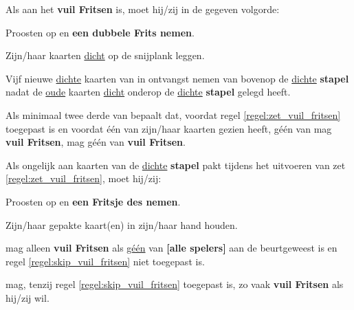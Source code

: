 \newpage
{}
\label{sec:vuil_fritsen}


\vervolgLijst{}
    \item Als \eenSpeler aan het \textbf{vuil Fritsen} is, moet hij/zij in de gegeven volgorde:
    \puntLijst{}
        \item Proosten op  en \textbf{een dubbele Frits nemen}\footnotemark[3].
        \item Zijn/haar kaarten \ul{dicht} op de snijplank leggen.
        \item Vijf nieuwe \ul{dichte} kaarten van \Frits in ontvangst nemen van bovenop de \ul{dichte} \textbf{stapel} nadat \Frits de \ul{oude} kaarten \ul{dicht} onderop de \ul{dichte} \textbf{stapel} gelegd heeft\footnotemark[2].
    \eindPuntLijst{}
     \label{regel:zet_vuil_fritsen}
\eindLijst{}

\vervolgLijst{}
    \item Als minimaal twee derde van \alleSpelers bepaalt dat, voordat regel \ref{regel:zet_vuil_fritsen} toegepast is en voordat \'e\'en van \alleSpelers zijn/haar kaarten gezien heeft, géén van \alleSpelers mag \textbf{vuil Fritsen}, mag géén van \alleSpelers \textbf{vuil Fritsen}.
    \label{regel:skip_vuil_fritsen}
\eindLijst{}

\vervolgLijst{}
    \item Als \eenSpeler ongelijk aan \Frits kaarten van de \ul{dichte} \textbf{stapel} pakt tijdens het uitvoeren van zet \ref{regel:zet_vuil_fritsen}, moet hij/zij:
    \puntLijst{}
        \item Proosten op  en \textbf{een Fritsje des nemen}\footnotemark[4].
        \item Zijn/haar gepakte kaart(en) in zijn/haar hand houden.
    \eindPuntLijst{}
\eindLijst{}

\vervolgLijst{}
    \item \EenSpeler mag alleen \textbf{vuil Fritsen} als \ul{g\'e\'en} van \textbf{[alle spelers]} aan de beurt\footnotemark[1] geweest is en regel \ref{regel:skip_vuil_fritsen} niet toegepast is. 
\eindLijst{}

\vervolgLijst{}
    \item \EenSpeler mag, tenzij regel \ref{regel:skip_vuil_fritsen} toegepast is, zo vaak \textbf{vuil Fritsen} als hij/zij wil. 
\eindLijst{}

